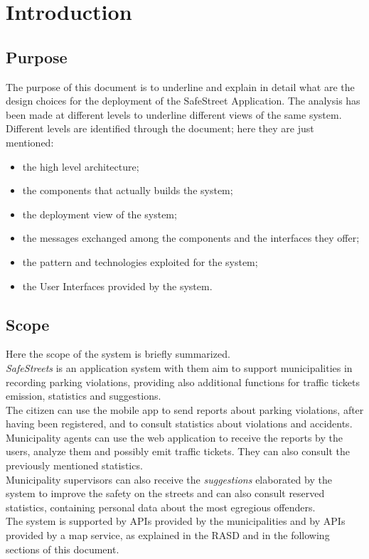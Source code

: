 \documentclass[a4paper]{report}
\begin{document}
\tableofcontents
\listoffigures
\begingroup
\let\clearpage\relax %
\listoftables
\endgroup
\restoregeometry

\chapter{Introduction}
\section{Purpose}

The purpose of this document is to underline and explain in detail what are the design choices for the deployment of the SafeStreet Application.  The analysis has been made at different levels to underline different views of the same system.
Different levels are identified through the document; here they are just mentioned:
\begin{itemize}
\item the high level architecture;
\item the components that actually builds the system;
\item the deployment view of the system;
\item the messages exchanged among the components and the interfaces they offer;
\item the pattern and technologies exploited for the system;
\item the User Interfaces provided by the system.
\end{itemize}

\section{Scope}
Here the scope of the system is briefly summarized.\\
\textit{SafeStreets} is an application system with them aim to support municipalities in recording parking violations, providing also additional functions for traffic tickets emission, statistics and suggestions.\\
The citizen can use the mobile app to send reports about parking violations, after having been registered, and to consult statistics about violations and accidents.\\
Municipality agents can use the web application to receive the reports by the users, analyze them and possibly emit traffic tickets. They can also consult the previously mentioned statistics.\\
Municipality supervisors can also receive the \textit{suggestions} elaborated by the system to improve the safety on the streets and can also consult reserved statistics, containing personal data about the most egregious offenders.\\
The system is supported by APIs provided by the municipalities and by APIs provided by a map service, as explained in the RASD and in the following sections of this document.
\end{document}
